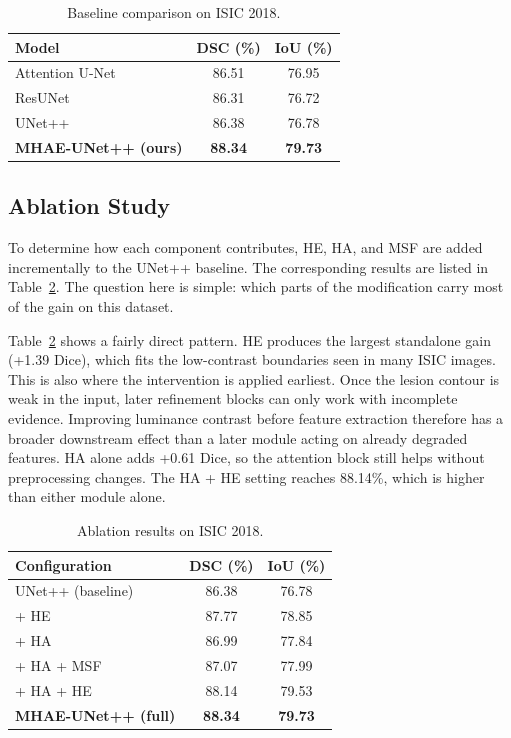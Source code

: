 \documentclass[conference]{IEEEtran}
\begin{document}
\begin{table}[!t]
\centering
\caption{Baseline comparison on ISIC 2018.}
\label{tab:comparison}
\begin{tabular*}{\columnwidth}{@{\extracolsep{\fill}}lcc@{}}
\toprule
\textbf{Model} & \textbf{DSC (\%)} & \textbf{IoU (\%)} \\
\midrule
Attention U-Net~\cite{oktay2018} & 86.51 & 76.95 \\
ResUNet~\cite{zhang2018}         & 86.31 & 76.72 \\
UNet++~\cite{zhou2018}           & 86.38 & 76.78 \\
\midrule
\textbf{MHAE-UNet++ (ours)} & \textbf{88.34} & \textbf{79.73} \\
\bottomrule
\end{tabular*}
\end{table}

\subsection{Ablation Study}

To determine how each component contributes, HE, HA, and MSF are added incrementally to the UNet++ baseline. The corresponding results are listed in Table~\ref{tab:ablation}. The question here is simple: which parts of the modification carry most of the gain on this dataset.

Table~\ref{tab:ablation} shows a fairly direct pattern. HE produces the largest standalone gain (+1.39 Dice), which fits the low-contrast boundaries seen in many ISIC images. This is also where the intervention is applied earliest. Once the lesion contour is weak in the input, later refinement blocks can only work with incomplete evidence. Improving luminance contrast before feature extraction therefore has a broader downstream effect than a later module acting on already degraded features. HA alone adds +0.61 Dice, so the attention block still helps without preprocessing changes. The HA + HE setting reaches 88.14\%, which is higher than either module alone.

\begin{table}[htbp]
\centering
\caption{Ablation results on ISIC 2018.}
\label{tab:ablation}
\begin{tabular*}{\columnwidth}{@{\extracolsep{\fill}}lcc@{}}
\toprule
\textbf{Configuration} & \textbf{DSC (\%)} & \textbf{IoU (\%)} \\
\midrule
UNet++ (baseline)      & 86.38 & 76.78 \\
+ HE                  & 87.77 & 78.85 \\
+ HA                  & 86.99 & 77.84 \\
+ HA + MSF            & 87.07 & 77.99 \\
+ HA + HE             & 88.14 & 79.53 \\
\midrule
\textbf{MHAE-UNet++ (full)} & \textbf{88.34} & \textbf{79.73} \\
\bottomrule
\end{tabular*}
\end{table}
\end{document}
